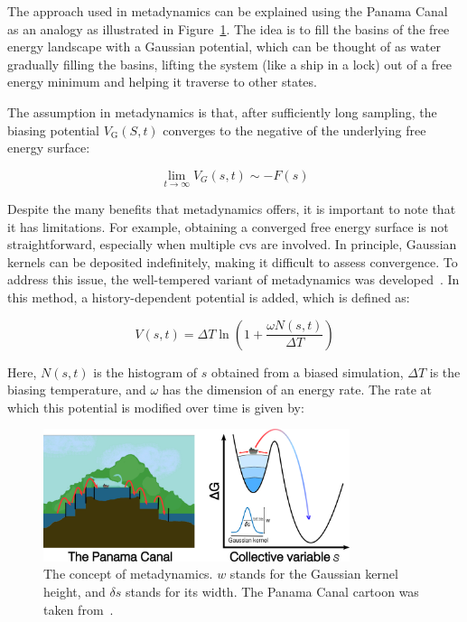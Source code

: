 The approach used in metadynamics can be explained using the Panama Canal as an analogy as illustrated in Figure~\ref{fig:metadynamics}. The idea is to fill the basins of the free energy landscape with a Gaussian potential, which can be thought of as water gradually filling the basins, lifting the system (like a ship in a lock) out of a free energy minimum and helping it traverse to other states.

The assumption in metadynamics is that, after sufficiently long sampling, the biasing potential $V_{\text{G}}(S, t)$ converges to the negative of the underlying free energy surface:

\begin{equation}
    \label{eq:free_energy_from_metadynamics}
    \lim_{t \to \infty} V_G(s,t) \sim -F(s)
\end{equation}

Despite the many benefits that metadynamics offers, it is important to note that it has limitations. For example, obtaining a converged free energy surface is not straightforward, especially when multiple \acp{cv} are involved. In principle, Gaussian kernels can be deposited indefinitely, making it difficult to assess convergence. To address this issue, the well-tempered variant of metadynamics was developed~\citep{barducciWellTemperedMetadynamicsSmoothly2008}. In this method, a history-dependent potential is added, which is defined as:

\begin{equation}
    V(s, t) = \Delta T \ln\left(1 + \frac{\omega N(s, t)}{\Delta T}\right)
    \label{eq:history_dependant_potential}
\end{equation}

Here, $N(s, t)$ is the histogram of $s$ obtained from a biased simulation, $\Delta T$ is the biasing temperature, and $\omega$ has the dimension of an energy rate. The rate at which this potential is modified over time is given by:

\begin{figure}[b!]
    \centering
    \includegraphics[width=0.8\textwidth]{Figures/2_Theory/theory_metadynamics.png}
    \caption{The concept of metadynamics. $w$ stands for the Gaussian kernel height, and $\delta s$ stands for its width. The Panama Canal cartoon was taken from~\citep{HowPanamaCanal}.}
    \label{fig:metadynamics}
\end{figure}

